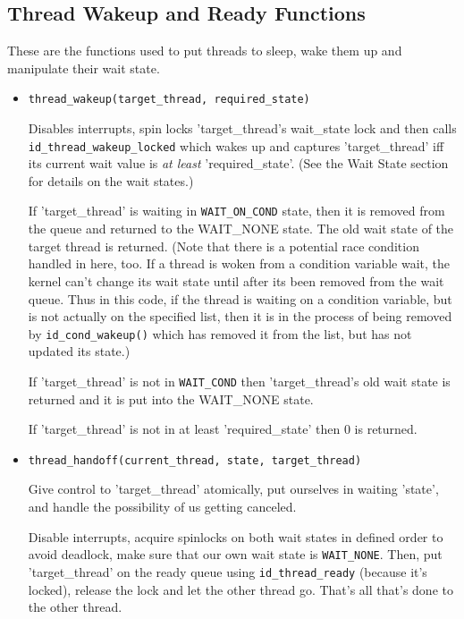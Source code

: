 \subsection{Thread Wakeup and Ready Functions}

These are the functions used to put threads to sleep, wake them
up and manipulate their wait state.

\begin{itemize}
\item{\tt thread_wakeup(target_thread, required_state)}

Disables interrupts, spin locks 'target_thread's wait_state lock
and then calls {\tt id_thread_wakeup_locked} which wakes up and
captures 'target_thread' iff its current wait value is
{\em at least} 'required_state'. (See the Wait State section for
details on the wait states.)

If 'target_thread' is waiting in {\tt WAIT_ON_COND} state, then it is
removed from the queue and returned to the WAIT_NONE state.  The old
wait state of the target thread is returned.
(Note that there is a potential race condition handled in here, too.
If a thread is woken from a condition variable wait, the kernel
can't change its wait state until after its been removed from the
wait queue.  Thus in this code, if the thread is waiting on a
condition variable, but is not actually on the specified list, then
it is in the process of being removed by {\tt id_cond_wakeup()} which
has removed it from the list, but has not updated its state.)

If 'target_thread' is not in {\tt WAIT_COND} then 'target_thread's
old wait state is returned and it is put into the WAIT_NONE state.

If 'target_thread' is not in at least 'required_state' then 0 is
returned.

\item{\tt thread_handoff(current_thread, state, target_thread)}

Give control to 'target_thread' atomically,
put ourselves in waiting 'state', and handle the possibility of
us getting canceled.

Disable interrupts, acquire spinlocks on both wait states in defined
order to avoid deadlock, make sure that our own wait state is
\texttt{WAIT_NONE}. Then, put 'target_thread' on the ready queue
using \texttt{id_thread_ready} (because it's locked), release
the lock and let the other thread go. That's all that's done to
the other thread.


\end{itemize}
